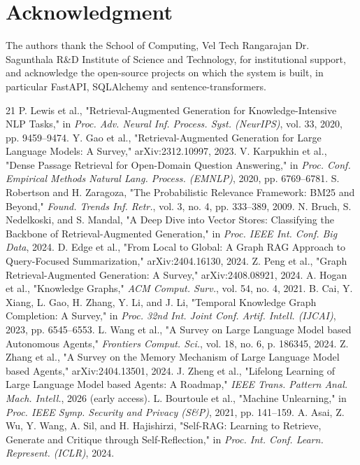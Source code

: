 \documentclass[conference]{IEEEtran}
\begin{document}
\section*{Acknowledgment}
The authors thank the School of Computing, Vel Tech Rangarajan Dr. Sagunthala R\&D Institute of Science and Technology, for institutional support, and acknowledge the open-source projects on which the system is built, in particular FastAPI, SQLAlchemy and sentence-transformers.
\begin{thebibliography}{21}
 P. Lewis et al., "Retrieval-Augmented Generation for Knowledge-Intensive NLP Tasks," in \textit{Proc. Adv. Neural Inf. Process. Syst. (NeurIPS)}, vol. 33, 2020, pp. 9459--9474.
 Y. Gao et al., "Retrieval-Augmented Generation for Large Language Models: A Survey," arXiv:2312.10997, 2023.
 V. Karpukhin et al., "Dense Passage Retrieval for Open-Domain Question Answering," in \textit{Proc. Conf. Empirical Methods Natural Lang. Process. (EMNLP)}, 2020, pp. 6769--6781.
 S. Robertson and H. Zaragoza, "The Probabilistic Relevance Framework: BM25 and Beyond," \textit{Found. Trends Inf. Retr.}, vol. 3, no. 4, pp. 333--389, 2009.
 N. Bruch, S. Nedelkoski, and S. Mandal, "A Deep Dive into Vector Stores: Classifying the Backbone of Retrieval-Augmented Generation," in \textit{Proc. IEEE Int. Conf. Big Data}, 2024.
 D. Edge et al., "From Local to Global: A Graph RAG Approach to Query-Focused Summarization," arXiv:2404.16130, 2024.
 Z. Peng et al., "Graph Retrieval-Augmented Generation: A Survey," arXiv:2408.08921, 2024.
 A. Hogan et al., "Knowledge Graphs," \textit{ACM Comput. Surv.}, vol. 54, no. 4, 2021.
 B. Cai, Y. Xiang, L. Gao, H. Zhang, Y. Li, and J. Li, "Temporal Knowledge Graph Completion: A Survey," in \textit{Proc. 32nd Int. Joint Conf. Artif. Intell. (IJCAI)}, 2023, pp. 6545--6553.
 L. Wang et al., "A Survey on Large Language Model based Autonomous Agents," \textit{Frontiers Comput. Sci.}, vol. 18, no. 6, p. 186345, 2024.
 Z. Zhang et al., "A Survey on the Memory Mechanism of Large Language Model based Agents," arXiv:2404.13501, 2024.
 J. Zheng et al., "Lifelong Learning of Large Language Model based Agents: A Roadmap," \textit{IEEE Trans. Pattern Anal. Mach. Intell.}, 2026 (early access).
 L. Bourtoule et al., "Machine Unlearning," in \textit{Proc. IEEE Symp. Security and Privacy (S\&P)}, 2021, pp. 141--159.
 A. Asai, Z. Wu, Y. Wang, A. Sil, and H. Hajishirzi, "Self-RAG: Learning to Retrieve, Generate and Critique through Self-Reflection," in \textit{Proc. Int. Conf. Learn. Represent. (ICLR)}, 2024.

\end{thebibliography}
\end{document}
